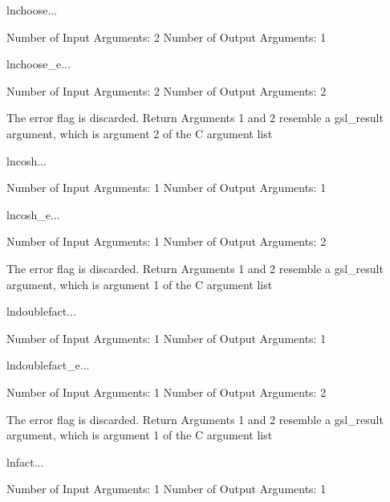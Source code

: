 \begin{funcdesc}{lnchoose}{...}

    Number of Input  Arguments:  2
    Number of Output Arguments:  1
\end{funcdesc}

\begin{funcdesc}{lnchoose_e}{...}

    Number of Input  Arguments:  2
    Number of Output Arguments:  2

The error flag is discarded.
Return Arguments 1 and 2 resemble a gsl_result argument,
	which is  argument 2 of the C argument list

\end{funcdesc}

\begin{funcdesc}{lncosh}{...}

    Number of Input  Arguments:  1
    Number of Output Arguments:  1
\end{funcdesc}

\begin{funcdesc}{lncosh_e}{...}

    Number of Input  Arguments:  1
    Number of Output Arguments:  2

The error flag is discarded.
Return Arguments 1 and 2 resemble a gsl_result argument,
	which is  argument 1 of the C argument list

\end{funcdesc}

\begin{funcdesc}{lndoublefact}{...}

    Number of Input  Arguments:  1
    Number of Output Arguments:  1
\end{funcdesc}

\begin{funcdesc}{lndoublefact_e}{...}

    Number of Input  Arguments:  1
    Number of Output Arguments:  2

The error flag is discarded.
Return Arguments 1 and 2 resemble a gsl_result argument,
	which is  argument 1 of the C argument list

\end{funcdesc}

\begin{funcdesc}{lnfact}{...}

    Number of Input  Arguments:  1
    Number of Output Arguments:  1
\end{funcdesc}

